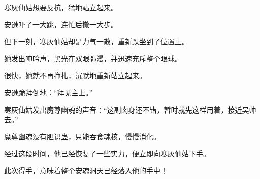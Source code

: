 \begin{this_body}
寒灰仙姑想要反抗，猛地站立起来。

安逊吓了一大跳，连忙后撤一大步。

但下一刻，寒灰仙姑却是力气一散，重新跌坐到了位置上。

她发出呻吟声，黑光在双眼弥漫，并迅速充斥整个眼球。

很快，她就不再挣扎，沉默地重新站立起来。

安逊跪拜倒地：“拜见主上。”

寒灰仙姑发出魔尊幽魂的声音：“这副肉身还不错，暂时就先这样用着，接近吴帅去。”

魔尊幽魂没有胆识蛊，只能吞食魂核，慢慢消化。

经过这段时间，他已经恢复了一些实力，便立即向寒灰仙姑下手。

此次得手，意味着整个安魂洞天已经落入他的手中！

\end{this_body}


